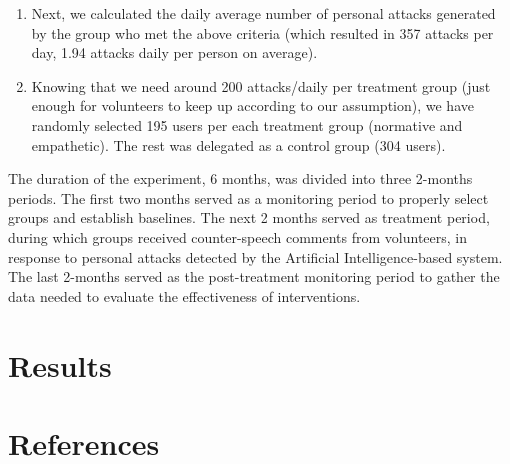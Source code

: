 \documentclass[
  10pt,
  dvipsnames,enabledeprecatedfontcommands]{scrartcl}
\begin{document}
\begin{enumerate}
   \item Next, we calculated the daily average number of personal attacks generated by the group who met the above criteria (which resulted in 357 attacks per day, 1.94 attacks daily per person on average).
   \item Knowing that we need around 200 attacks/daily per treatment group (just enough for volunteers to keep up according to our assumption), we have randomly selected 195 users per each treatment group (normative and empathetic). The rest was delegated as a control group (304 users). 
   
 \end{enumerate}

The duration of the experiment, 6 months, was divided into three
2-months periods. The first two months served as a monitoring period to
properly select groups and establish baselines. The next 2 months served
as treatment period, during which groups received counter-speech
comments from volunteers, in response to personal attacks detected by
the Artificial Intelligence-based system. The last 2-months served as
the post-treatment monitoring period to gather the data needed to
evaluate the effectiveness of interventions.

\hypertarget{results}{%
\section{Results}\label{results}}

\hypertarget{references}{%
\section*{References}\label{references}}

\vspace{-3mm}
\end{document}
